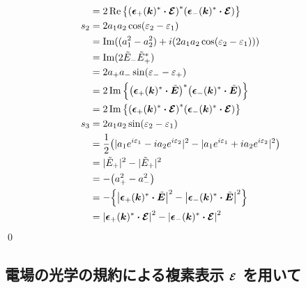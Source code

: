 \documentclass[uplatex,dvipdfmx,a4paper,11pt]{jlreq}
\makeatletter
\newcommand{\kk}{\bm{k}}
\theoremstyle{definition}
\renewenvironment{proof}[1][\proofname]{\par
  \normalfont
  \topsep6\p@\@plus6\p@ \trivlist
  \item[\hskip\labelsep{\bfseries #1}\@addpunct{\bfseries}]\ignorespaces\quad\par
}{%
  \qed\endtrivlist\@endpefalse
}
\renewcommand\proofname{証明}
\makeatother
\begin{document}
\begin{proof}
\begin{align}
        & = 2\Re\qty{\qty(\ee_+(\kk)^*\vdot\EC)^*\qty(\ee_-(\kk)^*\vdot\EC)}                                                                       \\
    s_2 & = 2a_1a_2\cos(\varepsilon_2 - \varepsilon_1)                                                                                             \\
        & = \Im((a_1^2 - a_2^2) + \ii(2a_1a_2\cos(\varepsilon_2 - \varepsilon_1)))                                                                 \\
        & = \Im(2\tilde{E}_-\tilde{E}_+^*)                                                                                                         \\
        & = 2a_+a_-\sin(\varepsilon_- - \varepsilon_+)                                                                                             \\
        & = 2\Im\qty{\qty(\ee_+(\kk)^*\vdot\ET)^*\qty(\ee_-(\kk)^*\vdot\ET)}                                                                       \\
        & = 2\Im\qty{\qty(\ee_+(\kk)^*\vdot\EC)^*\qty(\ee_-(\kk)^*\vdot\EC)}                                                                       \\
    s_3 & = 2a_1a_2\sin(\varepsilon_2 - \varepsilon_1)                                                                                             \\
        & = \frac{1}{2}\qty(|a_1e^{\ii\varepsilon_1} - \ii a_2e^{\ii\varepsilon_2}|^2 - |a_1e^{\ii\varepsilon_1} + \ii a_2e^{\ii\varepsilon_2}|^2) \\
        & = |\tilde{E}_+|^2 - |\tilde{E}_+|^2                                                                                                      \\
        & = -\qty(a_+^2 - a_-^2)                                                                                                                   \\
        & = -\qty{\qty|\ee_+(\kk)^*\vdot\ET|^2 - \qty|\ee_-(\kk)^*\vdot\ET|^2}                                                                     \\
        & = \qty|\ee_+(\kk)^*\vdot\EC|^2 - \qty|\ee_-(\kk)^*\vdot\EC|^2
  \end{align}
\end{proof}

\subsection{電場の光学の規約による複素表示 $\vb*{\mathcal{E}}$ を用いて}
\end{document}

